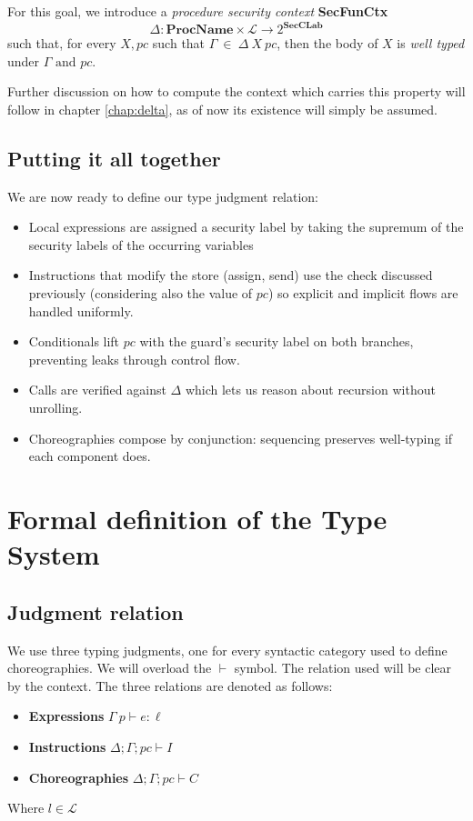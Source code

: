 \documentclass[12pt,a4paper,twoside]{book}
\newcommand{\MCL}{\mathscr{L}}
\begin{document}
For this goal, we introduce a \textit{procedure security context} \textbf{SecFunCtx}
$$\Delta: \textbf{ProcName} \times \MCL \rightarrow 2^\textbf{SecCLab}$$
such that, for every $X, pc$ such that $\Gamma ~ \in ~ \Delta ~ X ~ pc$, then the body of $X$ is \textit{well typed} under $\Gamma \text{ and } pc$.

Further discussion on how to compute the context which carries this property will follow in chapter \ref{chap:delta}, as of now its existence will simply be assumed.

\subsection{Putting it all together}
We are now ready to define our type judgment relation:
\begin{itemize}
  \item Local expressions are assigned a security label by taking the supremum of the security labels of the occurring variables
  \item Instructions that modify the store (assign, send) use the check discussed previously (considering also the value of $pc$) so explicit and implicit flows are handled uniformly.
  \item Conditionals lift $pc$ with the guard's security label on both branches, preventing leaks through control flow.
  \item Calls are verified against $\Delta$ which lets us reason about recursion without unrolling.
  \item Choreographies compose by conjunction: sequencing preserves well-typing if each component does.
\end{itemize}

\section{Formal definition of the Type System}
\label{type:formal}

\subsection{Judgment relation}
We use three typing judgments, one for every syntactic category used to define choreographies. We will overload the $\vdash$ symbol. The relation used will be clear by the context. The three relations are denoted as follows:
\begin{itemize}
	\item{\textbf{Expressions}} \(\Gamma~p \vdash e : \ell\)
	\item{\textbf{Instructions}} \(\Delta;\Gamma;pc \vdash I\)
	\item{\textbf{Choreographies}} \(\Delta;\Gamma;pc \vdash C\)
\end{itemize}
Where $l \in \MCL$ 
\end{document}

